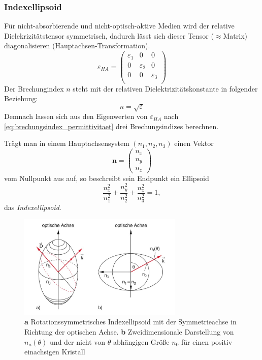 \documentclass[a4paper, 11pt, ngerman, parskip=half-]{scrartcl}
\begin{document}
\subsubsection*{Indexellipsoid}
Für nicht-absorbierende und nicht-optisch-aktive Medien wird der relative Dielekrizitätstensor symmetrisch, dadurch lässt sich dieser Tensor ($\approx$Matrix) diagonalisieren (Hauptachsen-Transformation).
\[\varepsilon_{HA} = \begin{pmatrix}
    \varepsilon_1 & 0 & 0 \\
    0 & \varepsilon_2 & 0 \\
    0 & 0 & \varepsilon_3 \\
\end{pmatrix}\]
Der Brechungindex $n$ steht mit der relativen Dielektrizitätskonstante in folgender Beziehung:
\begin{equation}
    \label{eq:brechungsindex_permittivitaet}
    n = \sqrt{\varepsilon}
\end{equation}
Demnach lassen sich aus den Eigenwerten von $\varepsilon_{HA}$ nach \autoref{eq:brechungsindex_permittivitaet} drei Brechungsindizes berechnen.

Trägt man in einem Hauptachsensystem $(n_1, n_2, n_3)$ einen Vektor
\[\textbf{n} = \begin{pmatrix}
    n_x \\
    n_y \\
    n_z
\end{pmatrix}\]
vom Nullpunkt aus auf, so beschreibt sein Endpunkt ein Ellipsoid
\[\frac{n_x^2}{n_1^2} + \frac{n_y^2}{n_2^2} + \frac{n_z^2}{n_3^2} = 1,\]
das \textit{Indexellipsoid}.
%
\begin{figure}[H]
    \centering
    \begin{samepage}
        \includegraphics[width=0.7\textwidth]{image/15/einachsiger_kristall.jpg}
        \caption{\textbf{a} Rotationssymmetrisches Indexellipsoid mit der Symmetrieachse in Richtung der optischen Achse. \textbf{b} Zweidimensionale Darstellung von $n_a(\theta)$ und der nicht von $\theta$ abhängigen Größe $n_0$ für einen positiv einachsigen Kristall}
        \label{fig:indexellipsoid_einachsig}
    \end{samepage}
\end{figure}
%
\end{document}
